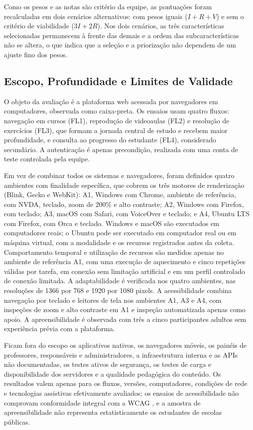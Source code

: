 \documentclass[sigconf, language=english, language=brazilian,natbib=false]{acmart}
\begin{document}
Como os pesos e as notas são critério da equipe, as pontuações foram recalculadas em dois cenários alternativos: com pesos iguais ($I + R + V$) e sem o critério de viabilidade ($3I + 2R$). Nos dois cenários, as três características selecionadas permanecem à frente das demais e a ordem das subcaracterísticas não se altera, o que indica que a seleção e a priorização não dependem de um ajuste fino dos pesos.

\subsection{Escopo, Profundidade e Limites de Validade}

O objeto da avaliação é a plataforma web acessada por navegadores em computadores, observada como caixa-preta. Os ensaios usam quatro fluxos: navegação em cursos (FL1), reprodução de videoaulas (FL2) e resolução de exercícios (FL3), que formam a jornada central de estudo e recebem maior profundidade, e consulta ao progresso do estudante (FL4), considerado secundário. A autenticação é apenas precondição, realizada com uma conta de teste controlada pela equipe.

Em vez de combinar todos os sistemas e navegadores, foram definidos quatro ambientes com finalidade específica, que cobrem os três motores de renderização (Blink, Gecko e WebKit): A1, Windows com Chrome, ambiente de referência, com NVDA, teclado, zoom de 200\% e alto contraste; A2, Windows com Firefox, com teclado; A3, macOS com Safari, com VoiceOver e teclado; e A4, Ubuntu LTS com Firefox, com Orca e teclado. Windows e macOS são executados em computadores reais; o Ubuntu pode ser executado em computador real ou em máquina virtual, com a modalidade e os recursos registrados antes da coleta.
Comportamento temporal e utilização de recursos são medidos apenas no ambiente de referência A1, com uma execução de aquecimento e cinco repetições válidas por tarefa, em conexão sem limitação artificial e em um perfil controlado de conexão limitada. A adaptabilidade é verificada nos quatro ambientes, nas resoluções de 1366 por 768 e 1920 por 1080 pixels. A acessibilidade combina navegação por teclado e leitores de tela nos ambientes A1, A3 e A4, com inspeções de zoom e alto contraste em A1 e inspeção automatizada apenas como apoio. A apreensibilidade é observada com três a cinco participantes adultos sem experiência prévia com a plataforma.

Ficam fora do escopo os aplicativos nativos, os navegadores móveis, os painéis de professores, responsáveis e administradores, a infraestrutura interna e as APIs não documentadas, os testes ativos de segurança, os testes de carga e disponibilidade dos servidores e a qualidade pedagógica do conteúdo. Os resultados valem apenas para os fluxos, versões, computadores, condições de rede e tecnologias assistivas efetivamente avaliados; os ensaios de acessibilidade não comprovam conformidade integral com a WCAG \cite{wcag21}, e a amostra de apreensibilidade não representa estatisticamente os estudantes de escolas públicas.
\end{document}
